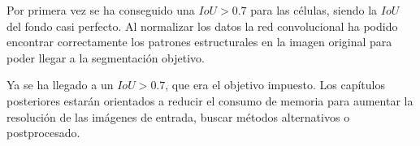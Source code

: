 


Por primera vez se ha conseguido una $IoU > 0.7$ para las células, siendo la $IoU$ del fondo casi perfecto. Al normalizar los datos la red convolucional ha podido encontrar correctamente los patrones estructurales en la imagen original para poder llegar a la segmentación objetivo.

Ya se ha llegado a un $IoU > 0.7$, que era el objetivo impuesto. Los capítulos posteriores estarán orientados a reducir el consumo de memoria para aumentar la resolución de las imágenes de entrada, buscar métodos alternativos o postprocesado.